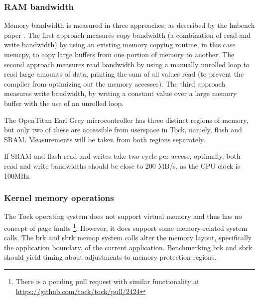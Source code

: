 \documentclass{article}
\begin{document}


\subsubsection{RAM bandwidth}
Memory bandwidth is measured in three approaches, as described by the lmbench paper \cite{lmbench}. The first approach measures copy bandwidth (a combination of read and write bandwidth) by using an existing memory copying routine, in this case memcpy, to copy large buffers from one portion of memory to another. The second approach measures read bandwidth by using a manually unrolled loop to read large amounts of data, printing the sum of all values read (to prevent the compiler from optimizing out the memory accesses). The third approach measures write bandwidth, by writing a constant value over a large memory buffer with the use of an unrolled loop.

The OpenTitan Earl Grey microcontroller has three distinct regions of memory, but only two of these are accessible from userspace in Tock, namely, flash and SRAM. Measurements will be taken from both regions separately.

If SRAM and flash read and writes take two cycle per access, optimally, both read and write bandwidths should be close to 200 MB/s, as the CPU clock is 100MHz.

\subsubsection{Kernel memory operations}
The Tock operating system does not support virtual memory and thus has no concept of page faults \footnote{There is a pending pull request with similar functionality at \url{https://github.com/tock/tock/pull/2424}}. However, it does support some memory-related system calls. The brk and sbrk memop system calls alter the memory layout, specifically the application boundary, of the current application. Benchmarking brk and sbrk should yield timing about adjustments to memory protection regions.
\end{document}
